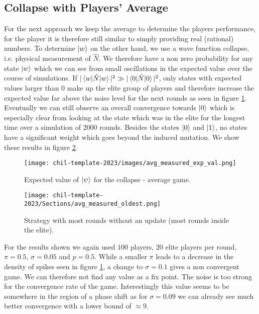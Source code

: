 \subsection{Collapse with Players' Average}
\label{sub: Collapse with players average}

For the next approach we keep the average to determine the players performance, for the player it is therefore still similar to simply providing real (rational) numbers. To determine $\ket{w}$ on the other hand, we use a wave function collapse, i.e. physical measurement of $\hat{N}$. We therefore have a non zero probability for any state $\ket{w}$ which we can see from small oscillations in the expected value over the course of simulations. If $|\braket{w|\hat{N}|w}|^2 \gg |\braket{0|\hat{N}|0}|^2$, only states with expected values larger than 0 make up the elite group of players and therefore increase the expected value far above the noise level for the next rounds as seen in figure \ref{fig:avg_measured_exp_val}. Eventually we can still observe an overall convergence towards $\ket{0}$ which is especially clear from looking at the state which was in the elite for the longest time over a simulation of 2000 rounds. Besides the states $\ket{0}$ and $\ket{1}$, no states have a significant weight which goes beyond the induced mutation. We show these results in figure \ref{fig:avg_measured_oldest}.

\begin{figure}[h]
    \centering
    \texttt{[image: chil-template-2023/images/avg\_measured\_exp\_val.png]}
    \caption{Expected value of $\ket{\psi}$ for the collapse - average game.}
    \label{fig:avg_measured_exp_val}
\end{figure}

\begin{figure}[h]
    \centering
    \texttt{[image: chil-template-2023/Sections/avg\_measured\_oldest.png]}
    \caption{Strategy with most rounds without an update (most rounds inside the elite).}
    \label{fig:avg_measured_oldest}
\end{figure}

For the results shown we again used $100$ players, $20$ elite players per round, $\pi = 0.5$, $\sigma = 0.05$ and $p = 0.5$. While a smaller $\pi$ leads to a decrease in the density of spikes seen in figure \ref{fig:avg_measured_exp_val}, a change to $\sigma = 0.1$ gives a non convergent game. We can therefore not find any value as a fix point. The noise is too strong for the convergence rate of the game. Interestingly this value seems to be somewhere in the region of a phase shift as for $\sigma = 0.09$ we can already see much better convergence with a lower bound of $\approx 9$.\\

